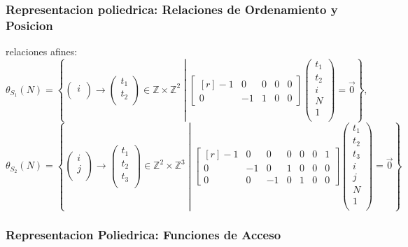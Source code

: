 \documentclass{beamer}\usetheme{Madrid} %
\begin{document}
\begin{frame}
\frametitle{Representacion poliedrica: Relaciones de Ordenamiento y Posicion}
relaciones afines: 
$$
{\scriptstyle
 \theta_{S_1}(N) = 
        \left\{ 
            \left(\begin{matrix}i\\\end{matrix} \right) \to 
            \left(\begin{matrix}t_1 \\ t_2\\\end{matrix} \right) 
            \in \mathbb{Z} \times \mathbb{Z}^2  \middle|
            \begin{bmatrix*}[r] -1 &  0 & 0 &  0 & 0 \\ 
                                0  & -1 & 1 &  0 & 0  \end{bmatrix*} 
            \left( \begin{array}{c} t_1 \\ t_2 \\ i \\ N \\ 1\\ \end{array} \right)
            = \vec{0}
        \right\},
}
$$ 
$$
{\scriptstyle
 \theta_{S_2}(N) = 
        \left\{ 
            \left(\begin{matrix}i \\ j \\\end{matrix} \right) \to 
            \left(\begin{matrix}t_1 \\ t_2 \\ t_3 \\\end{matrix} \right) 
            \in \mathbb{Z}^2 \times \mathbb{Z}^3  \middle|
            \begin{bmatrix*}[r] -1 &  0 &  0 & 0 &  0 & 0 & 1 \\ 
                                0  & -1 &  0 & 1 &  0 & 0 & 0 \\
                                0  &  0 & -1 & 0 &  1 & 0 & 0 \end{bmatrix*} 
            \left( \begin{array}{c} t_1 \\ t_2 \\ t_3 \\ i \\ j \\ N \\ 1\\ \end{array} \right)
            = \vec{0}
        \right\}
}
$$

\end{frame}
\begin{frame}
\frametitle{Representacion Poliedrica: Funciones de Acceso}

\end{frame}



\begin{frame}
\frametitle{}

\end{frame}


\end{document}
